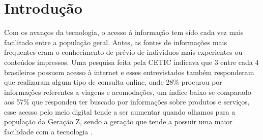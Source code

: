 
\chapter[Introdução]{Introdução}
\label{cap:intro}

\begin{comment}
Neste capítulo precisamos:
\begin{itemize}
    \item Introduzir o contexto
    \item Definir o que entendemos como avaliação de hotéis
    \item Apresentar em linhas gerais quais métodos são usados para detectar fake news, qual o estado da arte atual e quais são suas limitações.
    \item Descrever a nossa proposta e objetivos
    \item Descrever a estrutura do relatório.
\end{itemize}

\end{comment}

Com os avanços da tecnologia, o acesso à informação tem sido cada vez mais facilitado entre a população geral. Antes, as fontes de informações mais frequentes eram o conhecimento de prévio de indivíduos mais experientes ou conteúdos impressos. Uma pesquisa feita pela CETIC \cite{cetic2019pesquisa} indicava que 3 entre cada 4 brasileiros possuem acesso à internet e esses entrevistados também responderam que realizaram algum tipo de consulta online, onde 28\% procurou por informações referentes a viagens e acomodações, um índice baixo se comparado aos 57\% que respondeu ter buscado por informações sobre produtos e serviços, esse acesso pelo meio digital tende a ser aumentar quando olhamos para a população da Geração Z, sendo a geração que tende a possuir uma maior facilidade com a tecnologia \cite{sfodera2022technology}.

